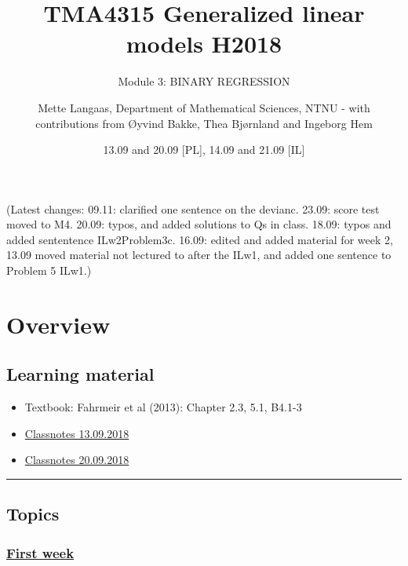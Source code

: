 \documentclass[
]{article}
\title{TMA4315 Generalized linear models H2018}
\subtitle{Module 3: BINARY REGRESSION}
\author{Mette Langaas, Department of Mathematical Sciences, NTNU - with
contributions from Øyvind Bakke, Thea Bjørnland and Ingeborg Hem}
\date{13.09 and 20.09 {[}PL{]}, 14.09 and 21.09 {[}IL{]}}
\providecommand{\tightlist}{%
  \setlength{\itemsep}{0pt}\setlength{\parskip}{0pt}}
\begin{document}
\maketitle

{
\setcounter{tocdepth}{2}
\tableofcontents
}
(Latest changes: 09.11: clarified one sentence on the devianc. 23.09:
score test moved to M4. 20.09: typos, and added solutions to Qs in
class. 18.09: typos and added sententence ILw2Problem3c. 16.09: edited
and added material for week 2, 13.09 moved material not lectured to
after the ILw1, and added one sentence to Problem 5 ILw1.)

\hypertarget{overview}{%
\section{Overview}\label{overview}}

\hypertarget{learning-material}{%
\subsection{Learning material}\label{learning-material}}

\begin{itemize}
\tightlist
\item
  Textbook: Fahrmeir et al (2013): Chapter 2.3, 5.1, B4.1-3
\item
  \href{https://www.math.ntnu.no/emner/TMA4315/2018h/TMA4315M3H20180913.pdf}{Classnotes
  13.09.2018}
\item
  \href{https://www.math.ntnu.no/emner/TMA4315/2018h/TMA4315M3H20180920.pdf}{Classnotes
  20.09.2018}
\end{itemize}

\begin{center}\rule{0.5\linewidth}{0.5pt}\end{center}

\hypertarget{topics}{%
\subsection{Topics}\label{topics}}

\hypertarget{first-week}{%
\subsubsection{\texorpdfstring{\protect\hyperlink{firstweek}{First
week}}{First week}}\label{first-week}}
\end{document}
